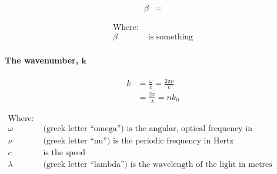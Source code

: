 \documentclass[colorlinks,11pt,a4paper,normalphoto,withhyper,ragged2e]{altareport}
\begin{document}
\begin{paracol}{2}

\medskip

\setlength{\jot}{2ex}
\begin{align}
	\beta &= \nonumber
\end{align}

\switchcolumn

\setlength{\jot}{1ex}
\begin{align}
	\text{Where:}& \nonumber\\
	\beta & \text{ is something} \nonumber
\end{align}

\end{paracol}




\paragraph{The wavenumber, $\textbf{k}$ \linebreak}



\begin{paracol}{2}

\medskip

\setlength{\jot}{2ex}
\begin{align}
	k &= \frac{\omega}{c} = \frac{2\pi\nu}{c} \nonumber\\
	&= \frac{2\pi}{\lambda} = nk_0 \nonumber
\end{align}

\switchcolumn

\setlength{\jot}{1ex}
\begin{align}
	\text{Where:}& \nonumber\\
	\omega & \text{ (greek letter ``omega'') is the angular, optical frequency in Radians/Second} \nonumber\\
	\nu & \text{ (greek letter ``nu'') is the periodic frequency in Hertz} \nonumber\\
	c & \text{ is the speed } \nonumber\\
	\lambda & \text{ (greek letter ``lambda'') is the wavelength of the light in metres} \nonumber	
\end{align}

\end{paracol}
\end{document}
